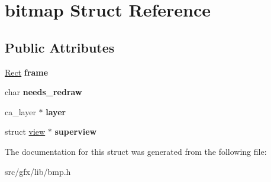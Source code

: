 \hypertarget{structbitmap}{}\section{bitmap Struct Reference}
\label{structbitmap}
\subsection*{Public Attributes}
\begin{DoxyCompactItemize}
\item 
\mbox{\label{structbitmap_a07e1037ae5ade25b17a6e57be66b12c2}} 
\hyperlink{structrect}{Rect} {\bfseries frame}
\item 
\mbox{\label{structbitmap_a0b7ca7647ceb156abb5a38536cbd3d49}} 
char {\bfseries needs\+\_\+redraw}
\item 
\mbox{\label{structbitmap_a853b94738c13938f21e7798062195f15}} 
ca\+\_\+layer $\ast$ {\bfseries layer}
\item 
\mbox{\label{structbitmap_aa8ee717489cde73839628a9f8ede7642}} 
struct \hyperlink{structview}{view} $\ast$ {\bfseries superview}
\end{DoxyCompactItemize}


The documentation for this struct was generated from the following file\+:\begin{DoxyCompactItemize}
\item 
src/gfx/lib/bmp.\+h\end{DoxyCompactItemize}
